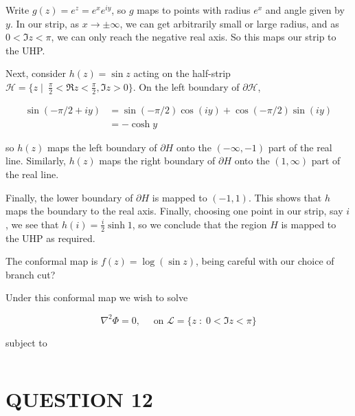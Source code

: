 \documentclass[a4paper]{article}
\begin{document}
Write $ g(z) = e^{z} = e^{x}e^{iy} $, so $ g $ maps to points with radius $ e^{x} $ and angle given by $ y $. In our strip, as $ x \to \pm \infty $, we can get arbitrarily small or large radius, and as $ 0 < \Im z < \pi $, we can only reach the negative real axis. So this maps our strip to the UHP.



Next, consider $ h(z) = \sin z $ acting on the half-strip $ \mathcal{H} = \{   z \; | \; \ \frac{\pi}{2} < \Re z < \frac{\pi}{2}, \Im z > 0 \} $. On the left boundary of $ \partial \mathcal{H} $, 

\begin{align*}
\sin(- \pi/2 + iy) & = \sin(-\pi/2)\cos(iy) + \cos(-\pi/2)\sin(iy)  \\
& = - \cosh y
\end{align*}

so $ h(z) $ maps the left boundary of $ \partial H $ onto the $ (-\infty,-1) $ part of the real line. Similarly, $ h(z) $ maps the right boundary of $ \partial H $ onto the $ (1,\infty) $ part of the real line. 

Finally, the lower boundary of $ \partial H $ is mapped to $ (-1,1) $. This shows that $ h $ maps the boundary to the real axis. Finally, choosing one point in our strip, say $ i $, we see that $ h(i) = \frac{i}{2} \sinh 1 $, so we conclude that the region $ H $ is mapped to the UHP as required. 


The conformal map is $ f(z) = \log (\sin z) $, being careful with our choice of branch cut?



Under this conformal map we wish to solve 

\[ \nabla^{2} \Phi = 0, \quad \text{ on } \mathcal{L} = \{  z \; : \; 0 < \Im z < \pi \}   \]

subject to 

\[  \]


\section{QUESTION 12}
\end{document}
